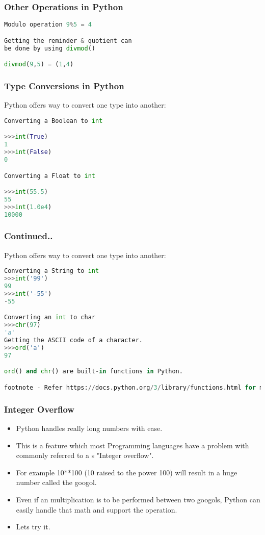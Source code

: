 \documentclass{beamer}
\begin{document}
\begin{frame}[fragile]
\frametitle{Other Operations in Python}
\begin{lstlisting}[language=Python]
Modulo operation 9%5 = 4

Getting the reminder & quotient can 
be done by using divmod()

divmod(9,5) = (1,4)

\end{lstlisting}
\end{frame}

\begin{frame}[fragile]
\frametitle{Type Conversions in Python}
Python offers way to convert one type into another:

\begin{lstlisting}[language=Python]
Converting a Boolean to int

>>>int(True)
1
>>>int(False)
0

Converting a Float to int

>>>int(55.5)
55
>>>int(1.0e4)
10000

\end{lstlisting}
\end{frame}
\begin{frame}[fragile]
\frametitle{Continued..}
Python offers way to convert one type into another:

\begin{lstlisting}[language=Python]
Converting a String to int
>>>int('99')
99
>>>int('-55')	
-55

Converting an int to char
>>>chr(97)
'a'
Getting the ASCII code of a character.
>>>ord('a')
97

ord() and chr() are built-in functions in Python.

footnote - Refer https://docs.python.org/3/library/functions.html for more details.
\end{lstlisting}
\end{frame}

\begin{frame}
\frametitle{Integer Overflow}
\begin{itemize}
\item Python handles really long numbers with ease.
\item This is a feature which most Programming languages have a problem with commonly referred to a s "Integer overflow".
\item For example 10**100 (10 raised to the power 100) will result in a huge number called the googol.
\item Even if an multiplication is to be performed between two googols, Python can easily handle that math and support the operation.
\item Lets try it.
\end{itemize}
\end{frame}
\end{document}
